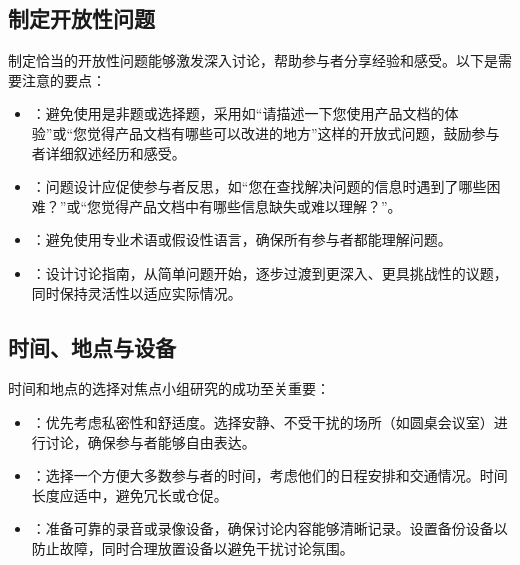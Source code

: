 \documentclass[letterpaper,10pt,english]{sphinxmanual}
\begin{document}
\subsection{制定开放性问题}
\label{\detokenize{user-research/focus-group:id15}}
\sphinxAtStartPar
制定恰当的开放性问题能够激发深入讨论，帮助参与者分享经验和感受。以下是需要注意的要点：
\begin{itemize}
\item {} 
\sphinxAtStartPar
{}：避免使用是非题或选择题，采用如“请描述一下您使用产品文档的体验”或“您觉得产品文档有哪些可以改进的地方”这样的开放式问题，鼓励参与者详细叙述经历和感受。

\item {} 
\sphinxAtStartPar
{}：问题设计应促使参与者反思，如“您在查找解决问题的信息时遇到了哪些困难？”或“您觉得产品文档中有哪些信息缺失或难以理解？”。

\item {} 
\sphinxAtStartPar
{}：避免使用专业术语或假设性语言，确保所有参与者都能理解问题。

\item {} 
\sphinxAtStartPar
{}：设计讨论指南，从简单问题开始，逐步过渡到更深入、更具挑战性的议题，同时保持灵活性以适应实际情况。

\end{itemize}


\subsection{时间、地点与设备}
\label{\detokenize{user-research/focus-group:id16}}
\sphinxAtStartPar
时间和地点的选择对焦点小组研究的成功至关重要：
\begin{itemize}
\item {} 
\sphinxAtStartPar
{}：优先考虑私密性和舒适度。选择安静、不受干扰的场所（如圆桌会议室）进行讨论，确保参与者能够自由表达。

\item {} 
\sphinxAtStartPar
{}：选择一个方便大多数参与者的时间，考虑他们的日程安排和交通情况。时间长度应适中，避免冗长或仓促。

\item {} 
\sphinxAtStartPar
{}：准备可靠的录音或录像设备，确保讨论内容能够清晰记录。设置备份设备以防止故障，同时合理放置设备以避免干扰讨论氛围。

\end{itemize}
\end{document}
